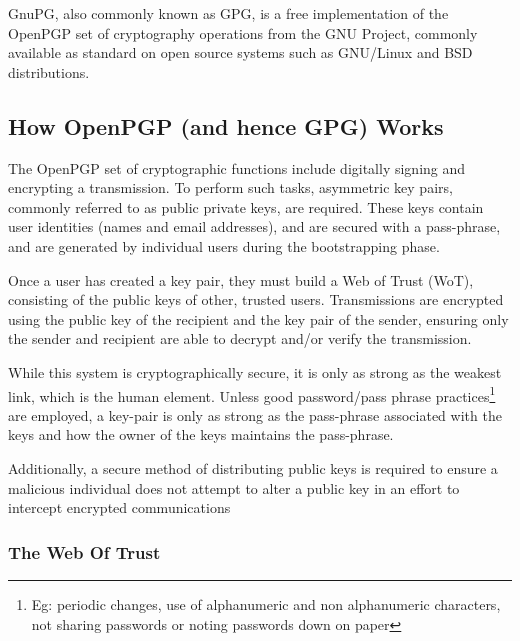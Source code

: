 
GnuPG, also commonly known as GPG, is a free implementation of the
OpenPGP set of cryptography operations from the GNU Project, commonly
available as standard on open source systems such as GNU/Linux and BSD 
distributions.


\subsection{How OpenPGP (and hence GPG) Works}

The OpenPGP set of cryptographic functions include digitally signing and
encrypting a transmission. To perform such tasks, asymmetric key pairs,
commonly referred to as public private keys, are required. These keys
contain user identities (names and email addresses), and are secured 
with a pass-phrase, and are generated by individual users during the 
bootstrapping phase.


Once a user has created a key pair, they must build a Web of Trust 
(WoT), consisting of the public keys of other, trusted users.
Transmissions are encrypted using the public key of the recipient and
the key pair of the sender, ensuring only the sender and recipient are
able to decrypt and/or verify the transmission.


While this system is cryptographically secure, it is only as strong as
the weakest link, which is the human element. Unless 
good password/pass phrase practices\footnote{Eg: periodic changes, use 
of alphanumeric and non alphanumeric characters, not sharing passwords 
or noting passwords down on paper} are employed, a key-pair is only as 
strong as the pass-phrase associated with the keys and how the owner of 
the keys maintains the pass-phrase.


Additionally, a secure method of distributing public keys is required to
ensure a malicious individual does not attempt to alter a public key in
an effort to intercept encrypted communications

\subsubsection{The Web Of Trust}

